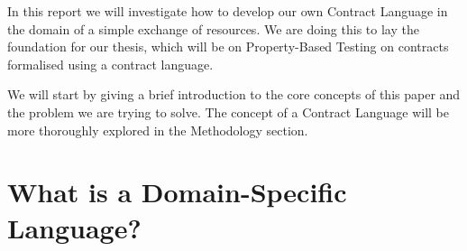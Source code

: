 \documentclass{ituthesis}
\begin{document}

%
In this report we will investigate how to develop our own Contract Language in the domain of a simple exchange of resources. We are doing this to lay the foundation for our thesis, which will be on Property-Based Testing on contracts formalised using a contract language.

We will start by giving a brief introduction to the core concepts of this paper and the problem we are trying to solve. The concept of a Contract Language will be more thoroughly explored in the Methodology section.

\section{What is a Domain-Specific Language?}
\end{document}
